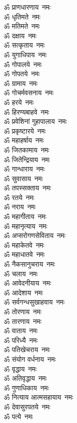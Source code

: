 \begin{multicols}{2}
\begin{flushleft}
ॐ प्राणधारणाय~नमः\\
ॐ धृतिमते~नमः\\
ॐ मतिमते~नमः\\
ॐ दक्षाय~नमः\\
ॐ सत्कृताय~नमः\\
ॐ युगाधिपाय~नमः\\
ॐ गोपालये~नमः\\
ॐ गोपतये~नमः\\
ॐ ग्रामाय~नमः\hfill{}\\
ॐ गोचर्मवसनाय~नमः\\
ॐ हरये~नमः\\
ॐ हिरण्यबाहवे~नमः\\
ॐ प्रवेशिनां गुहापालाय~नमः\\
ॐ प्रकृष्टारये~नमः\\
ॐ महाहर्षाय~नमः\\
ॐ जितकामाय~नमः\\
ॐ जितेन्द्रियाय~नमः\\
ॐ गान्धाराय~नमः\\
ॐ सुवासाय~नमः\hfill{}\\
ॐ तपस्सक्ताय~नमः\\
ॐ रतये~नमः\\
ॐ नराय~नमः\\
ॐ महागीताय~नमः\\
ॐ महानृत्याय~नमः\\
ॐ अप्सरोगणसेविताय~नमः\\
ॐ महाकेतवे~नमः\\
ॐ महाधातवे~नमः\\
ॐ नैकसानुचराय~नमः\\
ॐ चलाय~नमः\hfill{}\\
ॐ आवेदनीयाय~नमः\\
ॐ आदेशाय~नमः\\
ॐ सर्वगन्धसुखाहवाय~नमः\\
ॐ तोरणाय~नमः\\
ॐ तारणाय~नमः\\
ॐ वाताय~नमः\\
ॐ परिध्यै~नमः\\
ॐ पतिखेचराय~नमः\\
ॐ संयोग वर्धनाय~नमः\\
ॐ वृद्धाय~नमः\hfill{}\\
ॐ अतिवृद्धाय~नमः\\
ॐ गुणाधिकाय~नमः\\
ॐ नित्याय आत्मसहायाय~नमः\\
ॐ देवासुरपतये~नमः\\
ॐ पत्ये~नमः\\

\end{flushleft}
\end{multicols}
